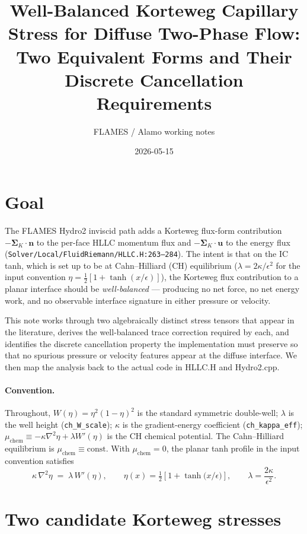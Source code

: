 \documentclass[11pt]{article}
\title{Well-Balanced Korteweg Capillary Stress for Diffuse Two-Phase
Flow: \\ Two Equivalent Forms and Their Discrete Cancellation Requirements}
\author{FLAMES / Alamo working notes}
\date{2026-05-15}
\newcommand{\grad}{\nabla}
\newcommand{\nn}{\mathbf{n}}
\newcommand{\uu}{\mathbf{u}}
\newcommand{\SK}{\boldsymbol{\Sigma}_K}
\begin{document}
\maketitle

\section{Goal}

The FLAMES Hydro2 inviscid path adds a Korteweg flux-form contribution
$-\SK\!\cdot\!\nn$ to the per-face HLLC momentum flux and
$-\SK\!\cdot\!\uu$ to the energy flux
(\texttt{Solver/Local/FluidRiemann/HLLC.H:263--284}). The intent is that on
the IC tanh, which is set up to be at Cahn--Hilliard (CH) equilibrium
($\lambda=2\kappa/\epsilon^2$ for the input convention $\eta=\tfrac12[1
+\tanh(x/\epsilon)]$), the Korteweg flux contribution to a planar interface
should be \emph{well-balanced} --- producing no net force, no net energy
work, and no observable interface signature in either pressure or velocity.

This note works through two algebraically distinct stress tensors that
appear in the literature, derives the well-balanced trace correction
required by each, and identifies the discrete cancellation property the
implementation must preserve so that no spurious pressure or velocity
features appear at the diffuse interface. We then map the analysis back
to the actual code in HLLC.H and Hydro2.cpp.

\paragraph{Convention.} Throughout, $W(\eta)=\eta^2(1-\eta)^2$ is the
standard symmetric double-well; $\lambda$ is the well height
(\texttt{ch\_W\_scale}); $\kappa$ is the gradient-energy coefficient
(\texttt{ch\_kappa\_eff}); $\mu_{\mathrm{chem}}\equiv-\kappa\grad^2\eta+\lambda W'(\eta)$
is the CH chemical potential. The Cahn--Hilliard equilibrium is
$\mu_{\mathrm{chem}}\equiv\mathrm{const}$. With $\mu_{\mathrm{chem}}=0$,
the planar tanh profile in the input convention satisfies
\begin{equation}
\kappa\,\grad^2\eta \;=\; \lambda\,W'(\eta), \qquad
\eta(x) = \tfrac12\!\left[1+\tanh\!\big(x/\epsilon\big)\right],
\qquad \lambda = \frac{2\kappa}{\epsilon^2}.
\label{eq:eq_relation}
\end{equation}

\section{Two candidate Korteweg stresses}
\end{document}
